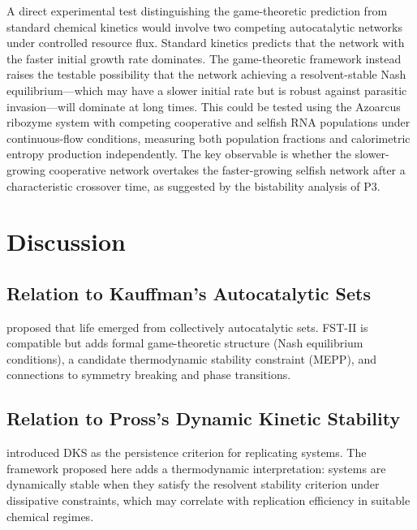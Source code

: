 \documentclass[12pt,a4paper]{article}
\theoremstyle{remark}
\begin{document}
A direct experimental test distinguishing the game-theoretic prediction from standard chemical kinetics would involve two competing autocatalytic networks under controlled resource flux. Standard kinetics predicts that the network with the faster initial growth rate dominates. The game-theoretic framework instead raises the testable possibility that the network achieving a resolvent-stable Nash equilibrium---which may have a slower initial rate but is robust against parasitic invasion---will dominate at long times. This could be tested using the Azoarcus ribozyme system with competing cooperative and selfish RNA populations under continuous-flow conditions, measuring both population fractions and calorimetric entropy production independently. The key observable is whether the slower-growing cooperative network overtakes the faster-growing selfish network after a characteristic crossover time, as suggested by the bistability analysis of P3.

\section{Discussion}
\label{sec:discussion}

\subsection{Relation to Kauffman's Autocatalytic Sets}

\citet{Kauffman1993} proposed that life emerged from collectively autocatalytic sets. FST-II is compatible but adds formal game-theoretic structure (Nash equilibrium conditions), a candidate thermodynamic stability constraint (MEPP), and connections to symmetry breaking and phase transitions.

\subsection{Relation to Pross's Dynamic Kinetic Stability}

\citet{Pross2012} introduced DKS as the persistence criterion for replicating systems. The framework proposed here adds a thermodynamic interpretation: systems are dynamically stable when they satisfy the resolvent stability criterion under dissipative constraints, which may correlate with replication efficiency in suitable chemical regimes.
\end{document}
